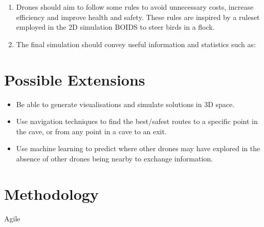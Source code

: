\documentclass{article}
\begin{document}
\begin{enumerate}
    \item Drones should aim to follow some rules to avoid unnecessary costs, increase efficiency and improve health and safety. These rules are inspired by a ruleset employed in the 2D simulation BOIDS to steer birds in a flock.
    
    \item The final simulation should convey useful information and statistics such as:
    
\end{enumerate}


\section{Possible Extensions}

\begin{itemize}
    \item Be able to generate visualisations and simulate solutions in 3D space.
    \item Use navigation techniques to find the best/safest routes to a specific point in the cave, or from any point in a cave to an exit.
    \item Use machine learning to predict where other drones may have explored in the absence of other drones being nearby to exchange information.
\end{itemize}

\section{Methodology}
Agile
\end{document}
